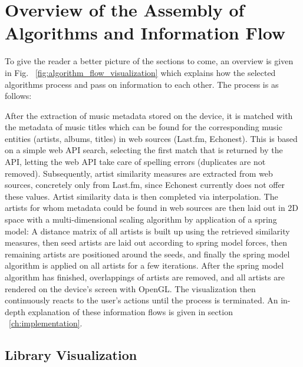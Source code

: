 \section{Overview of the Assembly of Algorithms and Information Flow}

To give the reader a better picture of the sections to come, an overview is given in Fig. ~\ref{fig:algorithm_flow_visualization} which explains how the selected algorithms process and pass on information to each other. The process is as follows:

\indent After the extraction of music metadata stored on the device, it is matched with the metadata of music titles which can be found for the corresponding music entities (artists, albums, titles) in web sources (Last.fm, Echonest). This is based on a simple web API search, selecting the first match that is returned by the API, letting the web API take care of spelling errors (duplicates are not removed). Subsequently, artist similarity measures are extracted from web sources, concretely only from Last.fm, since Echonest currently does not offer these values. Artist similarity data is then completed via interpolation. The artists for whom metadata could be found in web sources are then laid out in 2D space with a multi-dimensional scaling algorithm by application of a spring model: A distance matrix of all artists is built up using the retrieved similarity measures, then seed artists are laid out according to spring model forces, then remaining artists are positioned around the seeds, and finally the spring model algorithm is applied on all artists for a few iterations. After the spring model algorithm has finished, overlappings of artists are removed, and all artists are rendered on the device's screen with OpenGL. The visualization then continuously reacts to the user's actions until the process is terminated.
An in-depth explanation of these information flows is given in section ~\ref{ch:implementation}.

\subsection{Library Visualization}


